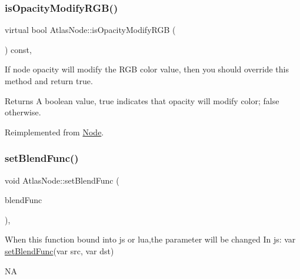 \subsubsection{\texorpdfstring{is\+Opacity\+Modify\+R\+G\+B()}{isOpacityModifyRGB()}\hspace{0.1cm}{\footnotesize\ttfamily [2/2]}}
{\footnotesize\ttfamily virtual bool Atlas\+Node\+::is\+Opacity\+Modify\+R\+GB (\begin{DoxyParamCaption}\item[{void}]{ }\end{DoxyParamCaption}) const\hspace{0.3cm}{\ttfamily [override]}, {\ttfamily [virtual]}}

If node opacity will modify the R\+GB color value, then you should override this method and return true. \begin{DoxyReturn}{Returns}
A boolean value, true indicates that opacity will modify color; false otherwise. 
\end{DoxyReturn}


Reimplemented from \hyperlink{classNode_ae6ce32d2088e2bb3426608334f1091c5}{Node}.

\mbox{\label{classAtlasNode_ad6f8b156ff845f7ffd08179e3a5af035}} 
\subsubsection{\texorpdfstring{set\+Blend\+Func()}{setBlendFunc()}\hspace{0.1cm}{\footnotesize\ttfamily [1/2]}}
{\footnotesize\ttfamily void Atlas\+Node\+::set\+Blend\+Func (\begin{DoxyParamCaption}\item[{const \hyperlink{structBlendFunc}{Blend\+Func} \&}]{blend\+Func }\end{DoxyParamCaption})\hspace{0.3cm}{\ttfamily [override]}, {\ttfamily [virtual]}}


\begin{DoxyCode}
When \textcolor{keyword}{this} \textcolor{keyword}{function} bound into js or lua,the parameter will be changed
In js: var \hyperlink{classAtlasNode_ad6f8b156ff845f7ffd08179e3a5af035}{setBlendFunc}(var src, var dst)
\end{DoxyCode}
  NA \mbox{\label{classAtlasNode_a3b718d1de3a8763fc3bfbab137f542de}} 
